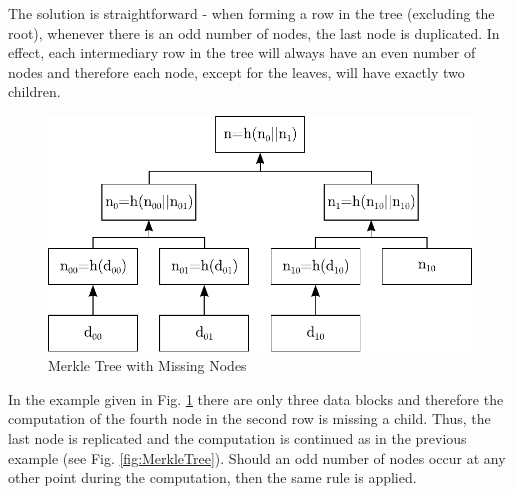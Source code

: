 \noindent
The solution is straightforward - when forming a row in the tree (excluding the root), whenever there is an odd number of nodes, the last node is duplicated. In effect, each intermediary row in the tree will always have an even number of nodes and therefore each node, except for the leaves, will have exactly two children.

\begin{figure}[htbp]
 \centering
 \includegraphics[scale=0.75]{images/MerkleTree2.pdf}
 \caption{Merkle Tree with Missing Nodes}
 \label{fig:MerkleTree2}
\end{figure}
\vspace{-10pt}

\noindent
In the example given in Fig. \ref{fig:MerkleTree2} there are only three data blocks and therefore the computation of the fourth node in the second row is missing a child. Thus, the last node is replicated and the computation is continued as in the previous example (see Fig. \ref{fig:MerkleTree}). Should an odd number of nodes occur at any other point during the computation, then the same rule is applied.